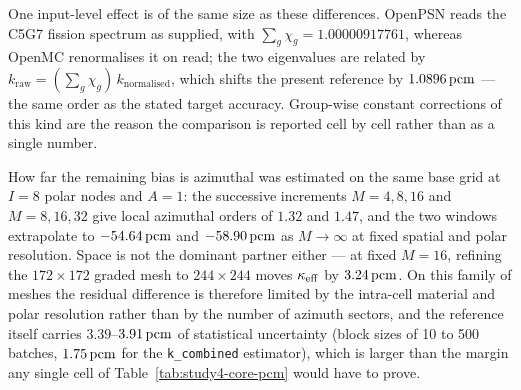 One input-level effect is of the same size as these differences. OpenPSN
reads the C5G7 fission spectrum as supplied, with
$\sum_g\chi_g=1.00000917761$, whereas OpenMC renormalises it on read; the two
eigenvalues are related by $k_\text{raw}=(\sum_g\chi_g)\,k_\text{normalised}$,
which shifts the present reference by $1.0896\,\mathrm{pcm}$ --- the same order as the
stated target accuracy. Group-wise constant corrections of this kind are the
reason the comparison is reported cell by cell rather than as a single
number.

How far the remaining bias is azimuthal was estimated on the same base grid at
$I{=}8$ polar nodes and $A{=}1$: the successive increments
$M{=}4,8,16$ and $M{=}8,16,32$ give local azimuthal orders of $1.32$ and
$1.47$, and the two windows extrapolate to $-54.64\,\mathrm{pcm}$ and $-58.90\,\mathrm{pcm}$ as
$M\rightarrow\infty$ at fixed spatial and polar resolution. Space is not the
dominant partner either --- at fixed $M{=}16$, refining the $172\times172$
graded mesh to $244\times244$ moves $\kappa_{\mathrm{eff}}$ by $3.24\,\mathrm{pcm}$. On this family of
meshes the residual difference is therefore limited by the intra-cell material
and polar resolution rather than by the number of azimuth sectors, and the
reference itself carries $3.39$--$3.91\,\mathrm{pcm}$ of statistical uncertainty (block
sizes of 10 to 500 batches, $1.75\,\mathrm{pcm}$ for the \texttt{k\_combined}
estimator), which is larger than the margin any single cell of
Table~\ref{tab:study4-core-pcm} would have to prove.

